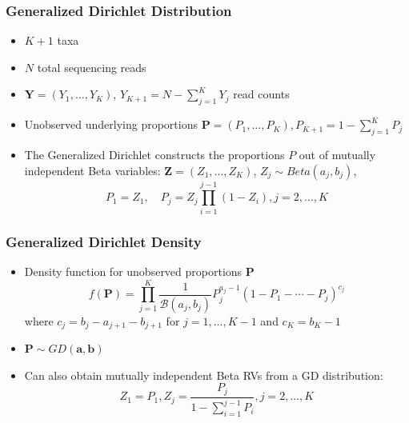 \documentclass{beamer}
\begin{document}
\begin{frame}
\frametitle{Generalized Dirichlet Distribution}
\begin{itemize}
  \item $K + 1$ taxa
  \item $N$ total sequencing reads
  \item $\bm{Y} = (Y_1, \ldots, Y_K)$, $Y_{K+1} = N - \sum_{j = 1}^K Y_j$ read counts
  \item Unobserved underlying proportions $\bm{P} = (P_1, \ldots , P_K), P_{K + 1} = 1 - \sum_{j = 1}^K P_j$
  \item The Generalized Dirichlet constructs the proportions $P$ out of mutually independent Beta variables: $\bm{Z} = (Z_1, \ldots, Z_K)$, $Z_j \sim Beta(a_j, b_j)$,
  $$P_1 = Z_1, \quad P_j = Z_j \prod_{i = 1}^{j-1}(1 - Z_i), j = 2, \ldots , K$$
\end{itemize}
\end{frame}
\begin{frame}
\frametitle{Generalized Dirichlet Density}
\begin{itemize}
  \item Density function for unobserved proportions $\bm{P}$
  $$f(\bm{P}) = \prod_{j = 1}^K \frac{1}{\mathcal{B}(a_j, b_j)}P_j^{a_j - 1}( 1 - P_1 - \cdots - P_j)^{c_j}$$
  where $c_j = b_j - a_{j + 1} - b_{j+1}$ for $j = 1, \ldots, K-1$ and $c_K = b_K - 1$
  \item $\bm{P} \sim GD(\bm{a}, \bm{b})$
    \item Can also obtain mutually independent Beta RVs from a GD distribution:
      $$Z_1 = P_1, Z_j = \frac{P_j}{1 - \sum_{i = 1}^{j -1} P_i}, j = 2, \ldots , K$$
\end{itemize}
\end{frame}
\end{document}
